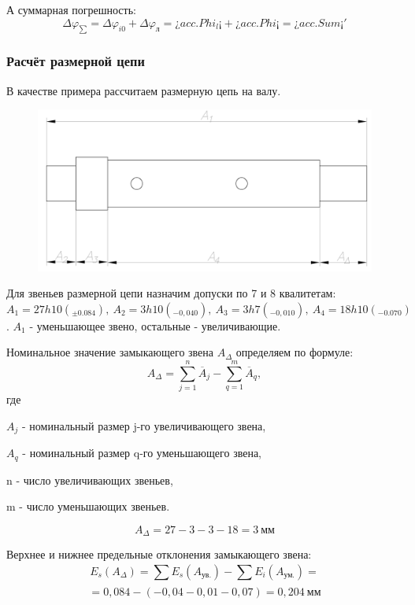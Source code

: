 \documentclass[14pt,a4paper,russian]{scrartcl}
\begin{document}
        А суммарная погрешность:
        \[ \Delta\varphi_{\sum} = \Delta\varphi_{i0}  + \Delta\varphi_{\text{л}} 
        = ¿acc.Phi_l¡ + ¿acc.Phi¡ = ¿acc.Sum¡' \]

    
    \subsubsection{Расчёт размерной цепи}
        В качестве примера рассчитаем размерную цепь на валу. 

    \begin{figure}[h]
        \centering
        \includegraphics[width=1\linewidth]{size_chain.png}
        \caption{}
        \label{Размерная цепь}
    \end{figure}
        
        Для звеньев размерной цепи назначим допуски по 7 и 8 квалитетам:
        \( A_1 = 27 h10(_{\pm0.084}),\ A_2 = 3 h10(_{-0,040}),
        \ A_3=3 h7(_{-0,010}),\ A_4=18 h10 (_{-0.070})\).
        \( A_1 \) - уменьшающее звено, остальные - увеличивающие.

        Номинальное значение замыкающего звена \( A_\Delta \) определяем 
        по формуле:
        \[ A_\Delta = \sum_{j=1}^{n}\overline{A}_j - 
            \sum_{q=1}^{m}\overline{A}_q, \]
        где\par
        \qquad \( A_j \) - номинальный размер j-го увеличивающего звена,\par 
        \qquad \( A_q \) - номинальный размер q-го уменьшающего звена,\par
        \qquad n - число увеличивающих звеньев,\par 
        \qquad m - число уменьшающих звеньев.\par
        
        \[ A_\Delta = 27-3-3-18=3\ \text{мм} \]
        

        Верхнее и нижнее предельные отклонения замыкающего звена:
        \[ E_s(A_\Delta) = \sum_{}^{}E_s(A_{\text{ув.}}) - \sum_{}^{}E_i(A_{\text{ум.}}) =\]
        \[ = 0,084 - (-0,04 - 0,01 - 0,07) = 0,204\ \text{мм} \]
        
\end{document}
